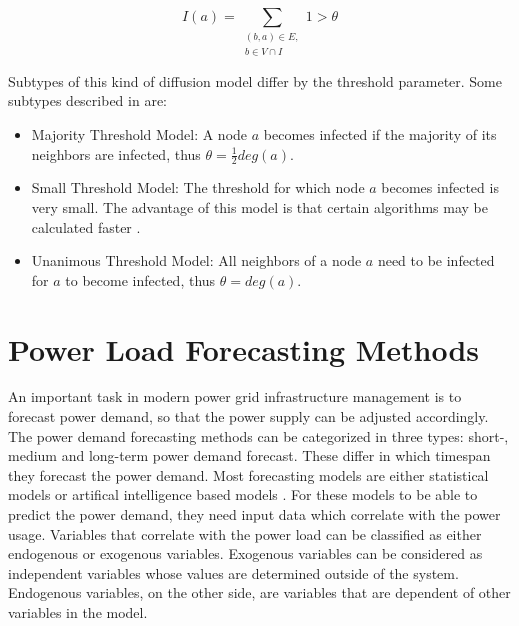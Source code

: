 \begin{equation}
    I(a) = \sum\limits_{\substack{(b,a)\in E, \\ b \in V \cap I}}
    1 > \theta    
    \label{eq:threshold}
\end{equation}

Subtypes of this kind of diffusion model differ by the threshold parameter.
Some subtypes described in \cite{diffusionbasics} are:

\begin{itemize}
    \item Majority Threshold Model: A node $a$ becomes
    infected if the majority of its neighbors are infected, thus 
    $\theta = \frac{1}{2}deg(a)$.
    \item Small Threshold Model: The threshold for which
    node $a$ becomes infected is very small. The advantage of this model is that 
    certain algorithms may be calculated faster \cite{diffusionbasics}.
    \item Unanimous Threshold Model: All neighbors 
    of a node $a$ need to be infected for $a$ to become infected, thus
    $\theta = deg(a)$.
\end{itemize}


\section{Power Load Forecasting Methods}
\label{powerloadsection}

An important task in modern power grid infrastructure management 
is to forecast power demand, so that the power supply can be adjusted accordingly.
The power demand forecasting methods can be categorized in three types:
short-, medium and long-term power demand forecast. These differ in which
timespan they forecast the power demand. Most forecasting models are 
either statistical models or artifical intelligence based models 
\cite{raza2015review}. For these models to be able to predict the power 
demand, they need input data which correlate with the power 
usage. Variables that correlate with the power load 
can be classified as either endogenous or exogenous variables.
Exogenous variables can be considered as independent variables 
whose values are determined outside of the system. 
Endogenous variables, on the other side, 
are variables that are dependent of other variables in the 
model.

